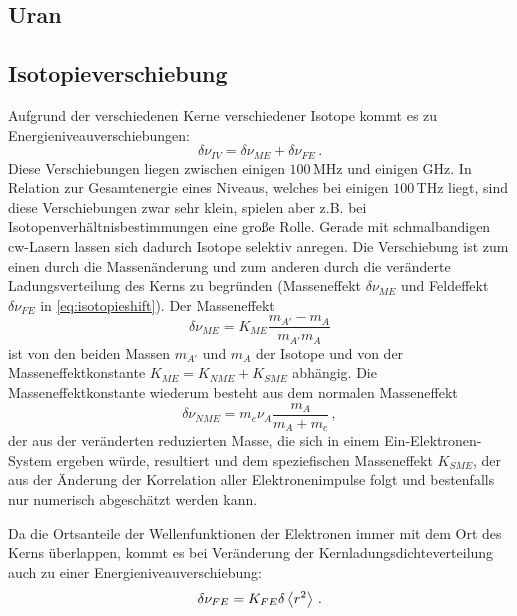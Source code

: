 \subsection{Uran}\label{subsec:uran}

\subsection{Isotopieverschiebung}\label{subsec:isotopieverschiebung}
Aufgrund der verschiedenen Kerne verschiedener Isotope kommt es zu
Energieniveauverschiebungen:
\begin{equation}\label{eq:isotopieshift}
	\delta\nu_{IV}=\delta\nu_{ME}+\delta\nu_{FE}\,.
\end{equation}
Diese Verschiebungen liegen zwischen einigen $100\,$MHz und einigen GHz. In
Relation zur Gesamtenergie eines Niveaus, welches bei einigen $100\,$THz liegt,
sind diese Verschiebungen zwar sehr klein, spielen aber z.B. bei
Isotopenverhältnisbestimmungen eine große Rolle. Gerade mit schmalbandigen
cw-Lasern lassen sich dadurch Isotope selektiv anregen. Die Verschiebung ist zum
einen durch die Massenänderung und zum anderen durch die veränderte Ladungsverteilung des Kerns zu begründen (Masseneffekt $\delta\nu_{ME}$ und Feldeffekt $\delta\nu_{FE}$ in \eqref{eq:isotopieshift}). Der Masseneffekt
\begin{equation}\label{eq:masseneffekt}
	\delta\nu_{ME}=K_{ME}\frac{m_{A'}-m_A}{m_{A'}m_A}
\end{equation}
ist von den beiden Massen $m_{A'}$ und $m_A$ der Isotope und von der
Masseneffektkonstante $K_{ME}=K_{NME}+K_{SME}$ abhängig. Die
Masseneffektkonstante wiederum besteht aus dem normalen Masseneffekt
\begin{equation}\label{eq:normaler_masseneffekt}
	\delta\nu_{NME}=m_e\nu_A\frac{m_A}{m_A+m_e}\,,
\end{equation}
der aus der veränderten reduzierten Masse, die sich in einem
Ein-Elektronen-System ergeben würde, resultiert und dem speziefischen
Masseneffekt $K_{SME}$, der aus der Änderung der Korrelation aller
Elektronenimpulse folgt und bestenfalls nur numerisch abgeschätzt werden
kann. \par Da die Ortsanteile der Wellenfunktionen der Elektronen immer mit dem Ort des
Kerns überlappen, kommt es bei Veränderung der Kernladungsdichteverteilung auch
zu einer Energieniveauverschiebung:
\begin{equation}\label{eq:feldeffekt}
	\delta\nu_{FE}=K_{FE}\delta\left\langle r^2\right\rangle\,.
\end{equation}

